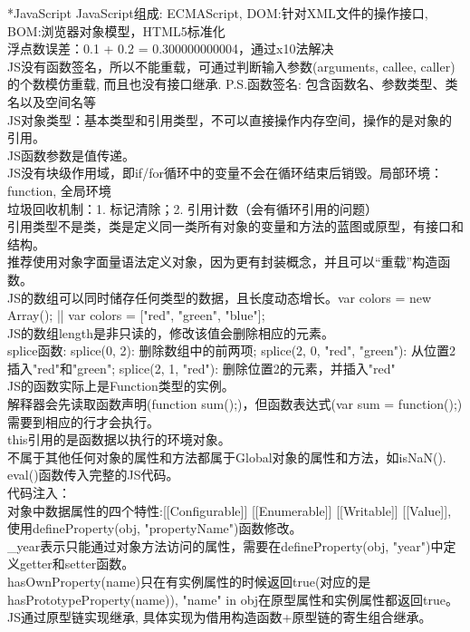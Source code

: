 \documentclass[UTF8]{ctexart}
\makeatletter
\renewcommand{\section}{\@startsection{section}{1}{0mm}
  {-\baselineskip}{0.5\baselineskip}{\bf\leftline}}
\makeatother
\begin{document}
\section*{JavaScript}
\noindent JavaScript组成: ECMAScript, DOM:针对XML文件的操作接口, BOM:浏览器对象模型，HTML5标准化\\
浮点数误差：0.1 + 0.2 = 0.300000000004，通过x10法解决\\
JS没有函数签名，所以不能重载，可通过判断输入参数(arguments, callee, caller)的个数模仿重载, 而且也没有接口继承. P.S.函数签名: 包含函数名、参数类型、类名以及空间名等\\
JS对象类型：基本类型和引用类型，不可以直接操作内存空间，操作的是对象的引用。\\
JS函数参数是值传递。\\
JS没有块级作用域，即if/for循环中的变量不会在循环结束后销毁。局部环境：function, 全局环境\\
垃圾回收机制：1. 标记清除；2. 引用计数（会有循环引用的问题）\\
引用类型不是类，类是定义同一类所有对象的变量和方法的蓝图或原型，有接口和结构。\\
推荐使用对象字面量语法定义对象，因为更有封装概念，并且可以“重载”构造函数。\\
JS的数组可以同时储存任何类型的数据，且长度动态增长。var colors = new Array(); || var colors = ["red", "green", "blue"];\\
JS的数组length是非只读的，修改该值会删除相应的元素。\\
splice函数: splice(0, 2): 删除数组中的前两项; splice(2, 0, "red", "green"): 从位置2插入"red"和"green"; splice(2, 1, "red"): 删除位置2的元素，并插入"red"\\
JS的函数实际上是Function类型的实例。\\
解释器会先读取函数声明(function sum(){};)，但函数表达式(var sum = function(){};)需要到相应的行才会执行。\\
this引用的是函数据以执行的环境对象。\\
不属于其他任何对象的属性和方法都属于Global对象的属性和方法，如isNaN().\\
eval()函数传入完整的JS代码。\\
代码注入：\\
对象中数据属性的四个特性:[[Configurable]] [[Enumerable]] [[Writable]] [[Value]], 使用defineProperty(obj, "propertyName")函数修改。\\
\_year表示只能通过对象方法访问的属性，需要在defineProperty(obj, "year")中定义getter和setter函数。\\
hasOwnProperty(name)只在有实例属性的时候返回true(对应的是hasPrototypeProperty(name)), "name" in obj在原型属性和实例属性都返回true。\\
JS通过原型链实现继承, 具体实现为借用构造函数+原型链的寄生组合继承。\\
\end{document}

